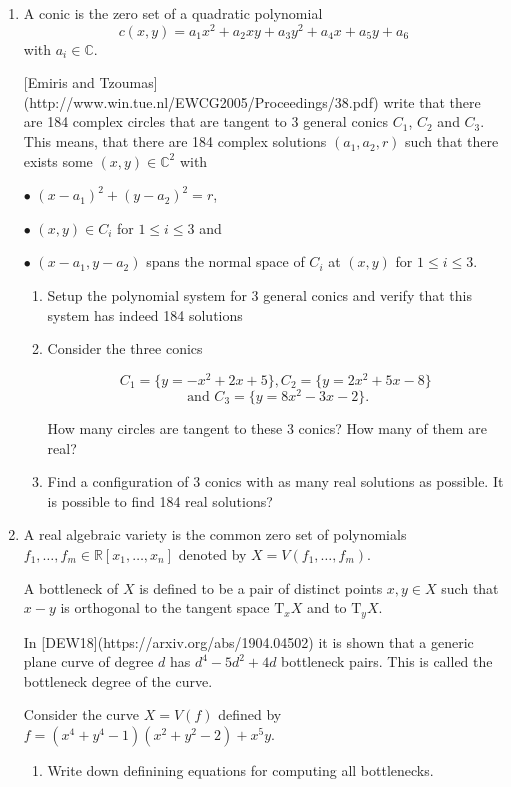 \documentclass[11pt,reqno]{amsart}
\theoremstyle{definition}
\theoremstyle{remark}
\numberwithin{equation}{section}
\begin{document}
\begin{enumerate}
\item A conic is the zero set of a quadratic polynomial
$$
c(x,y) = a_1 x^2 + a_2 x y + a_3 y^2 + a_4 x + a_5 y + a_6
$$
with $a_i \in \mathbb{C}$.

[Emiris and Tzoumas](http://www.win.tue.nl/EWCG2005/Proceedings/38.pdf) write that there are 184 complex circles that are tangent to 3 general conics $C_1$, $C_2$ and $C_3$. This means, that there are 184 complex solutions $(a_1,a_2,r)$ such that there exists some $(x,y)\in\mathbb{C}^2$ with

$\bullet$ $(x-a_1)^2 + (y-a_2)^2 = r$,

$\bullet$ $(x,y)\in C_i$ for $1\leq i\leq 3$ and

$\bullet$ $(x-a_1, y-a_2)$ spans the normal space of $C_i$ at $(x,y)$ for $1\leq i\leq 3$.
\begin{enumerate}
\item Setup the polynomial system for 3 general conics and verify that this system has indeed 184 solutions

\item
Consider the three conics

$$C_1 = \{y=-x^2+2x+5\}, C_2 = \{y = 2x^2+5x-8\}$$
$$ \text{ and } C_3 = \{y = 8x^2-3x-2\}.$$

How many circles are tangent to these 3 conics? How many of them are real?

\item Find a configuration of 3 conics with as many real solutions as possible. It is possible to find 184 real solutions?

\end{enumerate}

\item A real algebraic variety is the common zero set of polynomials $f_1, \ldots, f_m \in \mathbb{R}[x_1,\ldots,x_n]$ denoted by $X=V(f_1,\ldots,f_m)$.

A bottleneck of $X$ is defined to be a pair of distinct points $x, y \in X$ such that $x-y$ is orthogonal to the tangent space $\mathrm{T}_x X$ and to $\mathrm{T}_y X$.

In [DEW18](https://arxiv.org/abs/1904.04502) it is shown that a generic plane curve of degree $d$ has $d^4 −5d^2 +4d$ bottleneck pairs. This is called the {bottleneck degree} of the curve.


Consider the curve $X=V(f)$ defined by $f=(x^4 + y^4 - 1)(x^2 + y^2 - 2) + x^5y$.
\begin{enumerate}
\item Write down definining equations for computing all bottlenecks.


\end{enumerate}
\end{enumerate}
\end{document}
